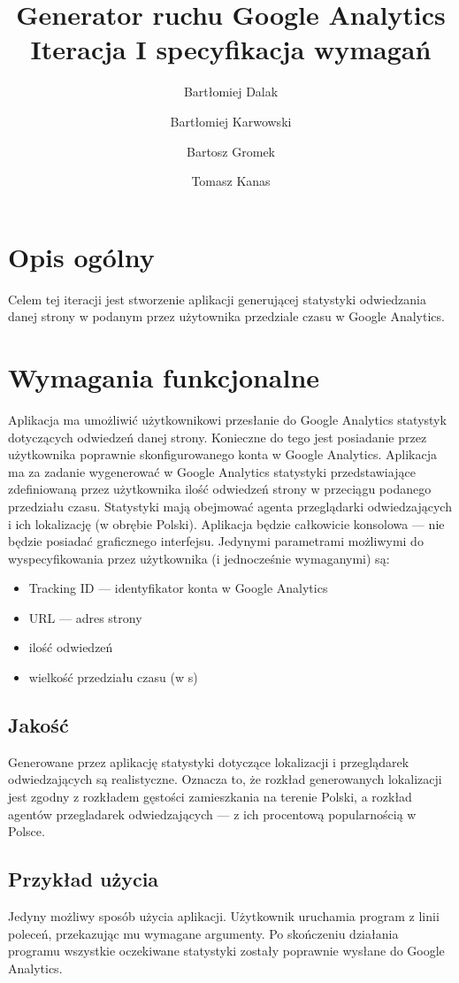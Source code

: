 \documentclass{article}
\title{Generator ruchu Google Analytics \\ Iteracja I specyfikacja wymagań}
\author{Bartłomiej Dalak \and Bartłomiej Karwowski \and Bartosz Gromek \and Tomasz Kanas}
\begin{document}
\maketitle

\section{Opis ogólny}

Celem tej iteracji jest stworzenie aplikacji generującej statystyki odwiedzania danej strony w podanym przez użytownika przedziale czasu w Google Analytics.

\section{Wymagania funkcjonalne}

Aplikacja ma umożliwić użytkownikowi przesłanie do Google Analytics statystyk dotyczących odwiedzeń danej strony. Konieczne do tego jest posiadanie przez użytkownika poprawnie skonfigurowanego konta w Google Analytics. Aplikacja ma za zadanie wygenerować w Google Analytics statystyki przedstawiające zdefiniowaną przez użytkownika ilość odwiedzeń strony w przeciągu podanego przedziału czasu. Statystyki mają obejmować agenta przeglądarki odwiedzających i ich lokalizację (w obrębie Polski). Aplikacja będzie całkowicie konsolowa --- nie będzie posiadać graficznego interfejsu. Jedynymi parametrami możliwymi do wyspecyfikowania przez użytkownika (i jednocześnie wymaganymi) są:
\begin{itemize}
\item Tracking ID --- identyfikator konta w Google Analytics
\item URL --- adres strony
\item ilość odwiedzeń
\item wielkość przedziału czasu (w s)
\end{itemize}

\subsection{Jakość}
Generowane przez aplikację statystyki dotyczące lokalizacji i przeglądarek odwiedzających są realistyczne. Oznacza to, że rozkład generowanych lokalizacji jest zgodny z rozkładem gęstości zamieszkania na terenie Polski, a rozkład agentów przegladarek odwiedzających --- z ich procentową popularnością w Polsce.

\subsection{Przykład użycia}
Jedyny możliwy sposób użycia aplikacji. Użytkownik uruchamia program z linii poleceń, przekazując mu wymagane argumenty. Po skończeniu działania programu wszystkie oczekiwane statystyki zostały poprawnie wysłane do Google Analytics.
\end{document}
